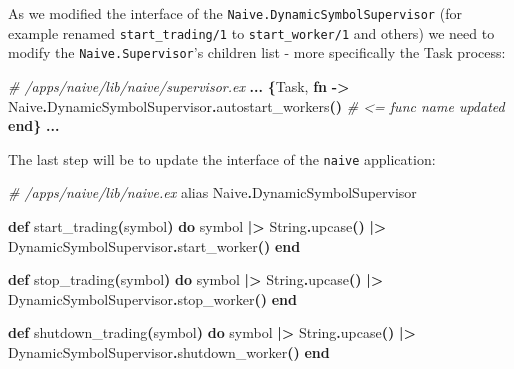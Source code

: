 \documentclass[
  oneside]{book}
\newenvironment{Shaded}{\begin{snugshade}}{\end{snugshade}}
\newcommand{\CommentTok}[1]{\textcolor[rgb]{0.56,0.35,0.01}{\textit{#1}}}
\newcommand{\ConstantTok}[1]{\textcolor[rgb]{0.56,0.35,0.01}{#1}}
\newcommand{\FunctionTok}[1]{\textcolor[rgb]{0.13,0.29,0.53}{\textbf{#1}}}
\newcommand{\ImportTok}[1]{#1}
\newcommand{\KeywordTok}[1]{\textcolor[rgb]{0.13,0.29,0.53}{\textbf{#1}}}
\newcommand{\NormalTok}[1]{#1}
\newcommand{\OperatorTok}[1]{\textcolor[rgb]{0.81,0.36,0.00}{\textbf{#1}}}
\begin{document}
As we modified the interface of the \texttt{Naive.DynamicSymbolSupervisor} (for example renamed \texttt{start\_trading/1} to \texttt{start\_worker/1} and others) we need to modify the \texttt{Naive.Supervisor}'s children list - more specifically the Task process:

\begin{Shaded}
\begin{Highlighting}[]
\CommentTok{\# /apps/naive/lib/naive/supervisor.ex}
      \OperatorTok{...}
      \FunctionTok{\{}\ConstantTok{Task}\NormalTok{,}
       \KeywordTok{fn} \OperatorTok{{-}\textgreater{}}
         \ConstantTok{Naive}\OperatorTok{.}\ConstantTok{DynamicSymbolSupervisor}\OperatorTok{.}\NormalTok{autostart\_workers}\FunctionTok{()} \CommentTok{\# \textless{}= func name updated}
       \KeywordTok{end}\FunctionTok{\}}
       \OperatorTok{...}
\end{Highlighting}
\end{Shaded}

The last step will be to update the interface of the \texttt{naive} application:

\begin{Shaded}
\begin{Highlighting}[]
\CommentTok{\# /apps/naive/lib/naive.ex}
  \ImportTok{alias} \ConstantTok{Naive}\OperatorTok{.}\ConstantTok{DynamicSymbolSupervisor}

  \KeywordTok{def}\NormalTok{ start\_trading}\FunctionTok{(}\NormalTok{symbol}\FunctionTok{)} \KeywordTok{do}
\NormalTok{    symbol}
    \OperatorTok{|\textgreater{}} \ConstantTok{String}\OperatorTok{.}\NormalTok{upcase}\FunctionTok{()}
    \OperatorTok{|\textgreater{}} \ConstantTok{DynamicSymbolSupervisor}\OperatorTok{.}\NormalTok{start\_worker}\FunctionTok{()}
  \KeywordTok{end}

  \KeywordTok{def}\NormalTok{ stop\_trading}\FunctionTok{(}\NormalTok{symbol}\FunctionTok{)} \KeywordTok{do}
\NormalTok{    symbol}
    \OperatorTok{|\textgreater{}} \ConstantTok{String}\OperatorTok{.}\NormalTok{upcase}\FunctionTok{()}
    \OperatorTok{|\textgreater{}} \ConstantTok{DynamicSymbolSupervisor}\OperatorTok{.}\NormalTok{stop\_worker}\FunctionTok{()}
  \KeywordTok{end}

  \KeywordTok{def}\NormalTok{ shutdown\_trading}\FunctionTok{(}\NormalTok{symbol}\FunctionTok{)} \KeywordTok{do}
\NormalTok{    symbol}
    \OperatorTok{|\textgreater{}} \ConstantTok{String}\OperatorTok{.}\NormalTok{upcase}\FunctionTok{()}
    \OperatorTok{|\textgreater{}} \ConstantTok{DynamicSymbolSupervisor}\OperatorTok{.}\NormalTok{shutdown\_worker}\FunctionTok{()}
  \KeywordTok{end}
\end{Highlighting}
\end{Shaded}
\end{document}
